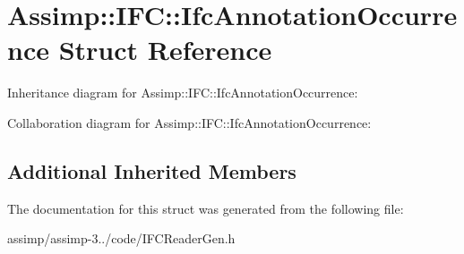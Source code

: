 \hypertarget{struct_assimp_1_1_i_f_c_1_1_ifc_annotation_occurrence}{\section{Assimp\+:\+:I\+F\+C\+:\+:Ifc\+Annotation\+Occurrence Struct Reference}
\label{struct_assimp_1_1_i_f_c_1_1_ifc_annotation_occurrence}
}


Inheritance diagram for Assimp\+:\+:I\+F\+C\+:\+:Ifc\+Annotation\+Occurrence\+:


Collaboration diagram for Assimp\+:\+:I\+F\+C\+:\+:Ifc\+Annotation\+Occurrence\+:
\subsection*{Additional Inherited Members}


The documentation for this struct was generated from the following file\+:\begin{DoxyCompactItemize}
\item 
assimp/assimp-\/3../code/I\+F\+C\+Reader\+Gen.\+h\end{DoxyCompactItemize}
